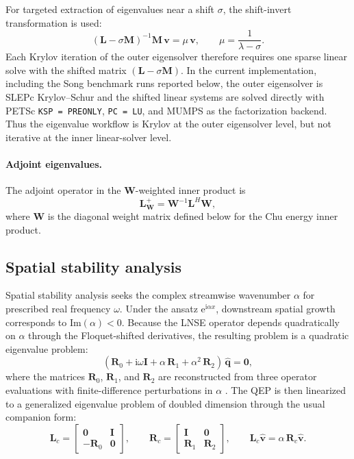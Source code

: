 \documentclass[11pt]{article}
\newcommand{\bq}{\mathbf{q}}
\newcommand{\bI}{\mathbf{I}}
\newcommand{\bL}{\mathbf{L}}
\newcommand{\bM}{\mathbf{M}}
\newcommand{\bR}{\mathbf{R}}
\newcommand{\bW}{\mathbf{W}}
\newcommand{\bv}{\mathbf{v}}
\begin{document}
For targeted extraction of eigenvalues near a shift $\sigma$, the shift-invert
transformation is used:
\begin{equation}
  (\bL - \sigma\bM)^{-1}\bM\,\bv = \mu\,\bv,
  \qquad
  \mu = \frac{1}{\lambda - \sigma}.
  \label{eq:shift_invert}
\end{equation}
Each Krylov iteration of the outer eigensolver therefore requires one sparse
linear solve with the shifted matrix $(\bL - \sigma\bM)$. In the current
implementation, including the Song benchmark runs reported below, the outer
eigensolver is SLEPc Krylov--Schur and the shifted linear systems are solved
directly with PETSc \texttt{KSP = PREONLY}, \texttt{PC = LU}, and MUMPS as the
factorization backend. Thus the eigenvalue workflow is Krylov at the outer
eigensolver level, but not iterative at the inner linear-solver level.

\paragraph{Adjoint eigenvalues.}
The adjoint operator in the $\bW$-weighted inner product is
\begin{equation}
  \bL^+_{\bW} = \bW^{-1}\bL^H\bW,
  \label{eq:adjoint_op}
\end{equation}
where $\bW$ is the diagonal weight matrix defined below for the Chu energy
inner product.

\subsection{Spatial stability analysis}
\label{sec:spatial}

Spatial stability analysis seeks the complex streamwise wavenumber $\alpha$ for
prescribed real frequency $\omega$. Under the ansatz
$\mathrm{e}^{\mathrm{i}\alpha x}$, downstream spatial growth corresponds to
$\mathrm{Im}(\alpha) < 0$. Because the LNSE operator depends quadratically on
$\alpha$ through the Floquet-shifted derivatives, the resulting problem is a
quadratic eigenvalue problem:
\begin{equation}
  (\bR_0 + \mathrm{i}\omega\bI + \alpha\,\bR_1 + \alpha^2\,\bR_2)\,\hat{\bq}
  = \bm{0},
  \label{eq:qep}
\end{equation}
where the matrices $\bR_0$, $\bR_1$, and $\bR_2$ are reconstructed from three
operator evaluations with finite-difference perturbations in $\alpha$
\citep{malik1990numerical}. The QEP is then linearized to a generalized
eigenvalue problem of doubled dimension through the usual companion form:
\begin{equation}
  \bL_c =
  \begin{bmatrix}
    \bm{0} & \bI \\
    -\bR_0 & \bm{0}
  \end{bmatrix},
  \qquad
  \bR_c =
  \begin{bmatrix}
    \bI & \bm{0} \\
    \bR_1 & \bR_2
  \end{bmatrix},
  \qquad
  \bL_c \hat{\bv} = \alpha\,\bR_c \hat{\bv}.
  \label{eq:companion}
\end{equation}
\end{document}
